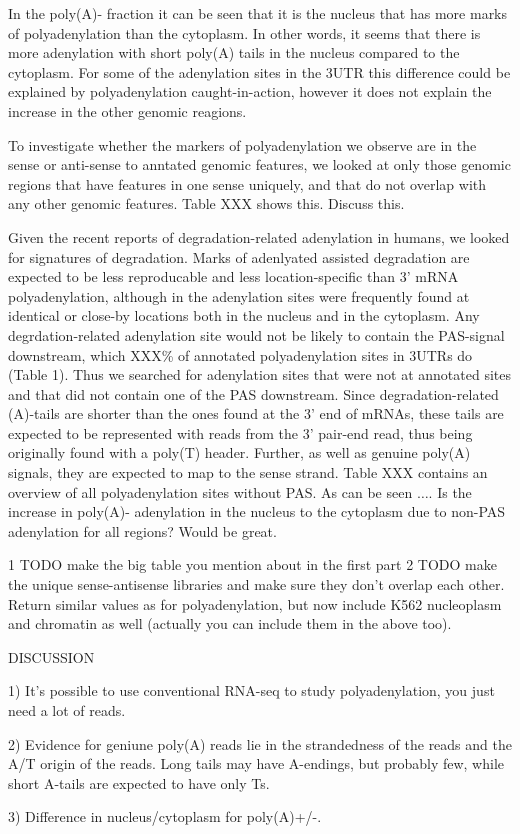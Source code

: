 \documentclass[a4paper]{article}
\begin{document}
In the poly(A)- fraction it can be seen that it is the nucleus that has more
marks of polyadenylation than the cytoplasm. In other words, it seems that
there is more adenylation with short poly(A) tails in the nucleus compared to
the cytoplasm. For some of the adenylation sites in the 3UTR this difference
could be explained by polyadenylation caught-in-action, however it does not
explain the increase in the other genomic reagions.

To investigate whether the markers of polyadenylation we observe are in the
sense or anti-sense to anntated genomic features, we looked at only those
genomic regions that have features in one sense uniquely, and that do not
overlap with any other genomic features. Table XXX shows this. Discuss this.

Given the recent reports of degradation-related adenylation in humans, we
looked for signatures of degradation. Marks of adenlyated assisted degradation
are expected to be less reproducable and less location-specific than 3' mRNA
polyadenylation, although in \cite{} the adenylation sites were frequently
found at identical or close-by locations both in the nucleus and in the
cytoplasm. Any degrdation-related adenylation site would not be likely to
contain the PAS-signal downstream, which XXX\% of annotated polyadenylation
sites in 3UTRs do (Table 1). Thus we searched for adenylation sites that were
not at annotated sites and that did not contain one of the PAS downstream.
Since degradation-related (A)-tails are shorter than the ones found at the 3'
end of mRNAs, these tails are expected to be represented with reads from the 3'
pair-end read, thus being originally found with a poly(T) header. Further, as
well as genuine poly(A) signals, they are expected to map to the sense strand.
Table XXX contains an overview of all polyadenylation sites without PAS. As can
be seen $\dots$. Is the increase in poly(A)- adenylation in the nucleus to the
cytoplasm due to non-PAS adenylation for all regions? Would be great.

1 TODO make the big table you mention about in the first part
2 TODO make the unique sense-antisense libraries and make sure they don't
overlap each other. Return similar values as for polyadenylation, but now
include K562 nucleoplasm and chromatin as well (actually you can include them
in the above too).

DISCUSSION

1) It's possible to use conventional RNA-seq to study polyadenylation, you just
need a lot of reads.

2) Evidence for geniune poly(A) reads lie in the strandedness of the reads and
the A/T origin of the reads. Long tails may have A-endings, but probably few,
while short A-tails are expected to have only Ts.

3) Difference in nucleus/cytoplasm for poly(A)+/-. 



%
\end{document}

